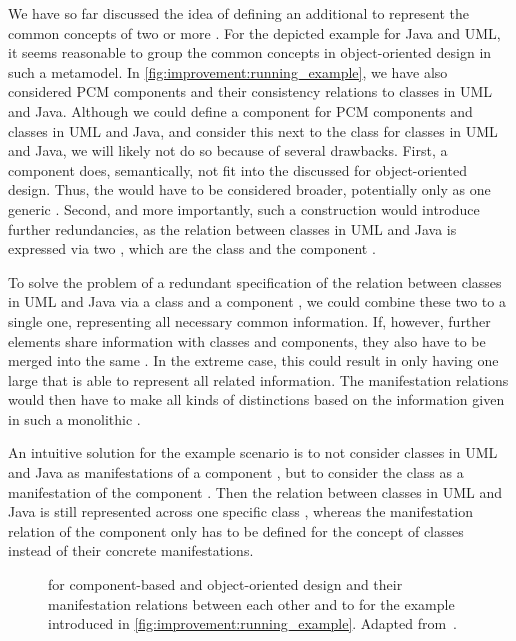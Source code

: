 We have so far discussed the idea of defining an additional \conceptmetamodel to represent the common concepts of two or more \concretemetamodels.
For the depicted example for Java and \gls{UML}, it seems reasonable to group the common concepts in object-oriented design in such a metamodel.
In \autoref{fig:improvement:running_example}, we have also considered \gls{PCM} components and their consistency relations to classes in \gls{UML} and Java.
Although we could define a component \commonality for \gls{PCM} components and classes in \gls{UML} and Java, and consider this \commonality next to the class \commonality for classes in \gls{UML} and Java, we will likely not do so because of several drawbacks.
First, a component \commonality does, semantically, not fit into the discussed \conceptmetamodel for object-oriented design. Thus, the \conceptmetamodel would have to be considered broader, potentially only as one generic \conceptmetamodel.
Second, and more importantly, such a construction would introduce further redundancies, as the relation between classes in \gls{UML} and Java is expressed via two \commonalities, which are the class \commonality and the component \commonality.

To solve the problem of a redundant specification of the relation between classes in \gls{UML} and Java via a class and a component \commonality, we could combine these two \commonalities to a single one, representing all necessary common information.
If, however, further elements share information with classes and components, they also have to be merged into the same \commonality.
In the extreme case, this could result in only having one large \commonality that is able to represent all related information.
The manifestation relations would then have to make all kinds of distinctions based on the information given in such a monolithic \commonality.

An intuitive solution for the example scenario is to not consider classes in \gls{UML} and Java as manifestations of a component \commonality, but to consider the class \commonality as a manifestation of the component \commonality.
Then the relation between classes in \gls{UML} and Java is still represented across one specific class \commonality, whereas the manifestation relation of the component \commonality only has to be defined for the concept of classes instead of their concrete manifestations.

\begin{figure}
    \centering
    
    \caption[Hierarchic composition of \conceptmetamodels]{\Conceptmetamodels for component-based and object-oriented design and their manifestation relations between each other and to \concretemetamodels for the example introduced in \autoref{fig:improvement:running_example}. Adapted from~.}
    \label{fig:improvement:composed_commonalities_example}
\end{figure}

